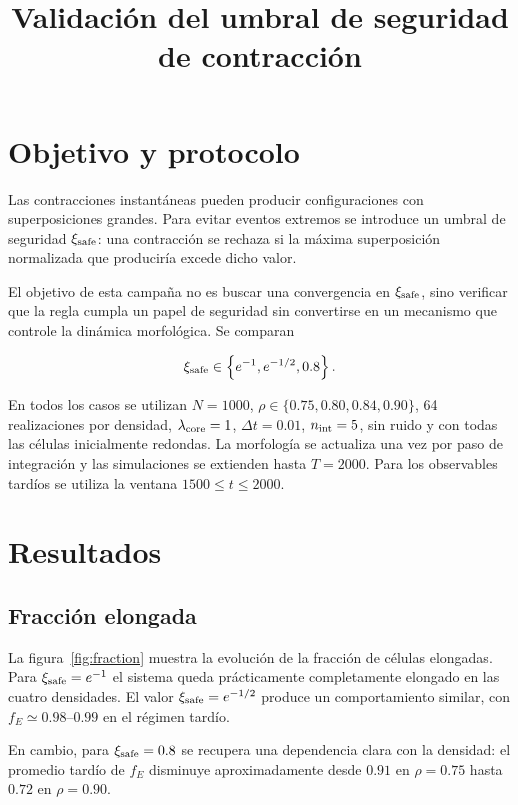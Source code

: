 \documentclass[11pt,a4paper]{article}
\title{Validación del umbral de seguridad de contracción}
\author{}
\date{}
\begin{document}
\maketitle

\section{Objetivo y protocolo}

Las contracciones instantáneas pueden producir configuraciones con
superposiciones grandes. Para evitar eventos extremos se introduce un umbral
de seguridad $\xi_{\rm safe}$: una contracción se rechaza si la máxima
superposición normalizada que produciría excede dicho valor.

El objetivo de esta campaña no es buscar una convergencia en
$\xi_{\rm safe}$, sino verificar que la regla cumpla un papel de seguridad sin
convertirse en un mecanismo que controle la dinámica morfológica. Se comparan

\begin{equation}
    \xi_{\rm safe}\in
    \left\{
        e^{-1},
        e^{-1/2},
        0.8
    \right\}.
\end{equation}

En todos los casos se utilizan
$N=1000$,
$\rho\in\{0.75,0.80,0.84,0.90\}$,
64 realizaciones por densidad,
$\lambda_{\rm core}=1$,
$\Delta t=0.01$,
$n_{\rm int}=5$,
sin ruido y con todas las células inicialmente redondas.
La morfología se actualiza una vez por paso de integración y las simulaciones
se extienden hasta $T=2000$. Para los observables tardíos se utiliza la ventana
$1500\leq t\leq2000$.

\section{Resultados}

\subsection{Fracción elongada}

La figura~\ref{fig:fraction} muestra la evolución de la fracción de células
elongadas. Para $\xi_{\rm safe}=e^{-1}$ el sistema queda prácticamente
completamente elongado en las cuatro densidades. El valor
$\xi_{\rm safe}=e^{-1/2}$ produce un comportamiento similar, con
$f_E\simeq0.98$--$0.99$ en el régimen tardío.

En cambio, para $\xi_{\rm safe}=0.8$ se recupera una dependencia clara con la
densidad: el promedio tardío de $f_E$ disminuye aproximadamente desde $0.91$
en $\rho=0.75$ hasta $0.72$ en $\rho=0.90$.
\end{document}
